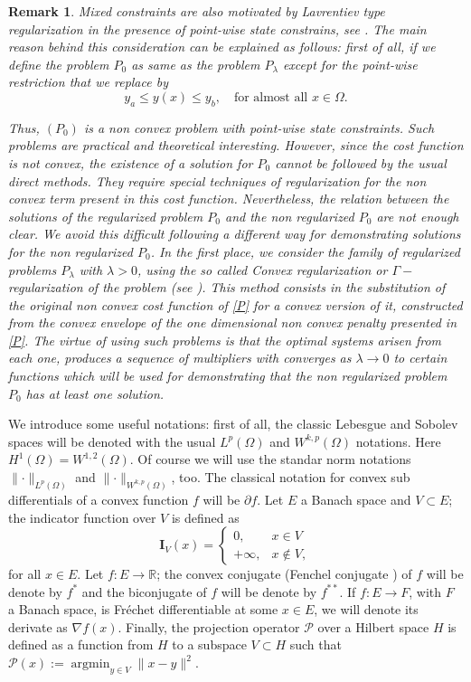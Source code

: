 \documentclass[11pt,a4paper]{amsart}
\DeclareMathOperator{\argmin}{argmin}
\newtheorem{remark}{{Remark}}
\newcommand{\norm}[1]{\lVert #1 \rVert}
\begin{document}
\begin{remark}
    Mixed constraints are also motivated by Lavrentiev type regularization in the presence of point-wise state constrains, see \cite{meyer1}. 
    The main reason behind this consideration can be explained as follows: first of all, if we define the problem $P_0$ as same as the problem $P_{\lambda}$ except for the point-wise restriction that we replace by $$y_a\le y(x)\le y_b,\quad \text{for almost all } x\in \Omega.$$
    
     Thus, $(P_{0})$ is a non convex problem with point-wise state constraints. Such problems are practical and theoretical interesting. However, since the cost function is not convex, the existence of a solution for $P_0$ cannot be followed by the usual direct methods. They require special techniques of regularization for the non convex term present in this cost function. Nevertheless, the relation between the solutions of the regularized problem $P_0$ and the non regularized $P_0$ are not enough clear. We avoid this difficult following a different way for demonstrating solutions for the non regularized $P_0$. In the first place, we consider the family of regularized problems $P_{\lambda}$ with $\lambda>0$, using the so called  \textit{Convex regularization} or $\Gamma-$\textit{regularization} of the problem (see \cite{eck}). This method consists in the substitution of the original non convex cost function of \eqref{P} for a convex version of it, constructed from the convex envelope of the one dimensional non convex penalty presented in \eqref{P}. The virtue of using such problems is that the optimal systems arisen from each one, produces a sequence of multipliers with converges as $\lambda\to 0$ to certain functions which will be used for demonstrating that the non regularized problem $P_0$ has at least one solution.
\end{remark}
 

We introduce some useful notations: first of all, the classic Lebesgue and Sobolev spaces will be denoted with the usual $L^p(\Omega)$ and $W^{k,p}(\Omega)$ notations. Here $H^1(\Omega)=W^{1,2}(\Omega)$. Of course we will use the standar norm notations $\norm{\cdot}_{L^p(\Omega)}$ and $\norm{\cdot}_{W^{k,p}(\Omega)}$, too. The classical notation for convex sub differentials of a convex function $f$ will be $\partial f$. Let $E$ a Banach space and $V\subset E$; the indicator function over $V$ is defined as
\[
\mathbf{I}_{V}(x)=\begin{cases}
    0,& x\in V\\
    +\infty,&x\notin V,
\end{cases}
\]
for all $x\in E$. Let $f:E\to \mathbb{R}$; the convex conjugate (Fenchel conjugate \cite{rock}) of $f$ will be denote by $f^*$ and the biconjugate of $f$ will be denote by $f^{**}$. If $f:E\to F$, with $F$ a Banach space, is Fréchet differentiable at some $x\in E$, we will denote its derivate as $\nabla f(x)$. Finally, the projection operator $\mathcal{P}$ over a Hilbert space $H$ is defined as a function from $H$ to a subspace $V\subset H$ such that $\mathcal{P}(x):=\argmin_{y\in V}\norm{x-y}^2$.
\end{document}
